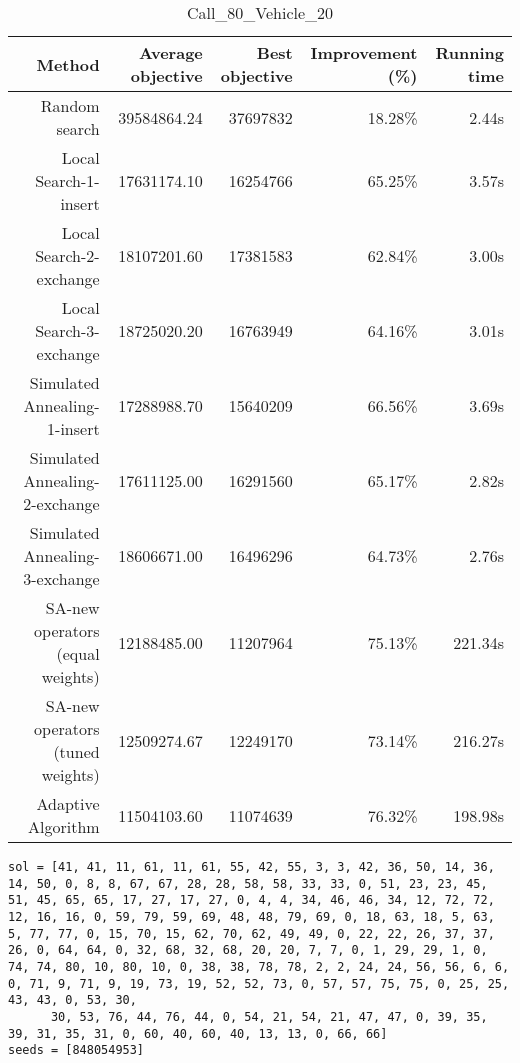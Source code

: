 \begin{table}[ht]
\centering
\caption{Call\_80\_Vehicle\_20}
\label{tab:call80vehicle20}
\begin{tabular}{|r|r|r|r|r|}
Method & Average objective & Best objective & Improvement (\%) & Running time \\
\hline
Random search & 39584864.24 & 37697832 & 18.28\% & 2.44s\\
Local Search-1-insert & 17631174.10 & 16254766 & 65.25\% & 3.57s\\
Local Search-2-exchange & 18107201.60 & 17381583 & 62.84\% & 3.00s\\
Local Search-3-exchange & 18725020.20 & 16763949 & 64.16\% & 3.01s\\
Simulated Annealing-1-insert & 17288988.70 & 15640209 & 66.56\% & 3.69s\\
Simulated Annealing-2-exchange & 17611125.00 & 16291560 & 65.17\% & 2.82s\\
Simulated Annealing-3-exchange & 18606671.00 & 16496296 & 64.73\% & 2.76s\\
SA-new operators (equal weights) & 12188485.00 & 11207964 & 75.13\% & 221.34s\\
SA-new operators (tuned weights) & 12509274.67 & 12249170 & 73.14\% & 216.27s\\
Adaptive Algorithm & 11504103.60 & 11074639 & 76.32\% & 198.98s\\
\end{tabular}%
\end{table}
\begin{lstlisting}[label={lst:call80vehicle20},caption=Optimal solution call\_80\_vehicle\_20]
sol = [41, 41, 11, 61, 11, 61, 55, 42, 55, 3, 3, 42, 36, 50, 14, 36, 14, 50, 0, 8, 8, 67, 67, 28, 28, 58, 58, 33, 33, 0, 51, 23, 23, 45, 51, 45, 65, 65, 17, 27, 17, 27, 0, 4, 4, 34, 46, 46, 34, 12, 72, 72, 12, 16, 16, 0, 59, 79, 59, 69, 48, 48, 79, 69, 0, 18, 63, 18, 5, 63, 5, 77, 77, 0, 15, 70, 15, 62, 70, 62, 49, 49, 0, 22, 22, 26, 37, 37, 26, 0, 64, 64, 0, 32, 68, 32, 68, 20, 20, 7, 7, 0, 1, 29, 29, 1, 0, 74, 74, 80, 10, 80, 10, 0, 38, 38, 78, 78, 2, 2, 24, 24, 56, 56, 6, 6, 0, 71, 9, 71, 9, 19, 73, 19, 52, 52, 73, 0, 57, 57, 75, 75, 0, 25, 25, 43, 43, 0, 53, 30,
      30, 53, 76, 44, 76, 44, 0, 54, 21, 54, 21, 47, 47, 0, 39, 35, 39, 31, 35, 31, 0, 60, 40, 60, 40, 13, 13, 0, 66, 66]
seeds = [848054953]
\end{lstlisting}%
\clearpage


